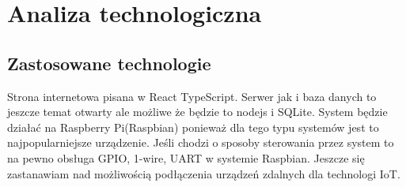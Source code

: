 \chapter{Analiza technologiczna}
\section{Zastosowane technologie}
Strona internetowa pisana w React TypeScript. Serwer jak i baza danych to jeszcze temat otwarty ale możliwe że będzie to nodejs i SQLite. System będzie działać na Raspberry Pi(Raspbian) ponieważ dla tego typu systemów jest to najpopularniejsze urządzenie.
Jeśli chodzi o sposoby sterowania przez system to na pewno obsługa GPIO, 1-wire, UART w systemie Raspbian. Jeszcze się zastanawiam nad możliwością podłączenia urządzeń zdalnych dla technologi IoT.

